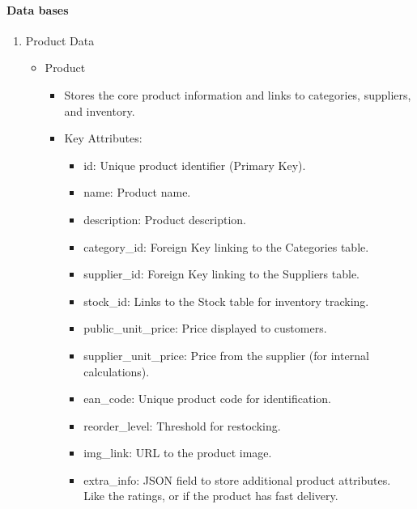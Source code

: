\documentclass{llncs}
\begin{document}
\paragraph{Data bases}
\begin{enumerate}
    \item Product Data\\
          \begin{itemize}
              \item Product
                    \begin{itemize}
                        \item Stores the core product information and links to categories, suppliers, and inventory.
                        \item Key Attributes:
                              \begin{itemize}
                                  \item id: Unique product identifier (Primary Key).
                                  \item name: Product name.
                                  \item description: Product description.
                                  \item category\_id: Foreign Key linking to the Categories table.
                                  \item supplier\_id: Foreign Key linking to the Suppliers table.
                                  \item stock\_id: Links to the Stock table for inventory tracking.
                                  \item public\_unit\_price: Price displayed to customers.
                                  \item supplier\_unit\_price: Price from the supplier (for internal calculations).
                                  \item ean\_code: Unique product code for identification.
                                  \item reorder\_level: Threshold for restocking.
                                  \item img\_link: URL to the product image.
                                  \item extra\_info: JSON field to store additional product attributes. Like the ratings, or if the product has fast delivery.
                              \end{itemize}
                    \end{itemize}

\end{itemize}
\end{enumerate}
\end{document}
